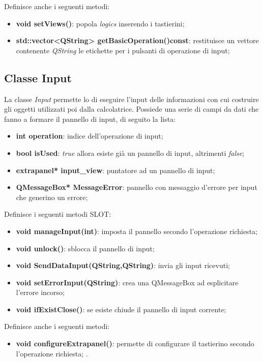\documentclass[a4paper,10pt]{article}
\begin{document}
            Definisce anche i seguenti metodi:
            \begin{itemize}
                \item \textbf{void setViews()}: popola \textit{logics} inserendo i tastierini;
                \item \textbf{std::vector<QString> getBasicOperation()const}: restituisce un vettore contenente \textit{QString} le etichette per i pulsanti di operazione di input;
            \end{itemize}
    
            \subsection{Classe Input}
            La classe \textit{Input} permette lo di eseguire l'input delle informazioni con cui costruire gli oggetti utilizzati poi dalla calcolatrice.
            Possiede una serie di campi da dati che fanno a formare il pannello di input, di seguito la lista:
            \begin{itemize}
                \item \textbf{int operation}: indice dell'operazione di input;
                \item \textbf{bool isUsed}: \textit{true} allora esiste già un pannello di input, altrimenti \textit{false};
                \item \textbf{extrapanel* input\_view}: puntatore ad un pannello di input;
                \item \textbf{QMessageBox* MessageError}: pannello con messaggio d'errore per input che generino un errore;
            \end{itemize}
            Definisce i seguenti metodi SLOT:
            \begin{itemize}
                \item \textbf{void manageInput(int)}: imposta il pannello secondo l'operazione richiesta;
                \item \textbf{void unlock()}: sblocca il pannello di input;
                \item \textbf{void SendDataInput(QString,QString)}: invia gli input ricevuti;
                \item \textbf{void setErrorInput(QString)}: crea una QMessageBox ad esplicitare l'errore incorso;
                \item \textbf{void ifExistClose()}: se esiste chiude il pannello di input corrente;
            \end{itemize}
            Definisce anche i seguenti metodi:
            \begin{itemize}
                \item \textbf{void configureExtrapanel()}: permette di configurare il tastierino secondo l'operazione richiesta;   .       
            \end{itemize}
    
\end{document}
